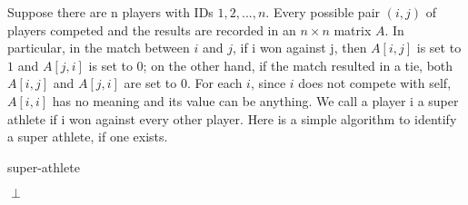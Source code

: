 Suppose there are n players with IDs $1, 2, . . . , n$. Every possible pair $(i, j)$ of players competed and the
results are recorded in an $n \times n$ matrix $A$. In particular, in the match between $i$ and $j$, if i won against
j, then $A[i, j]$ is set to $1$ and $A[j, i]$ is set to $0$; on the other hand, if the match resulted in a tie, both
$A[i, j]$ and $A[j, i]$ are set to $0$. For each $i$, since $i$ does not compete with self, $A[i, i]$ has no meaning
and its value can be anything. We call a player i a super athlete if i won against every other player.
Here is a simple algorithm to identify a super athlete, if one exists.

\begin{algorithm}
    \SetAlgoLined
    \caption{super-athlete}

    \Return $\perp$
\end{algorithm}

